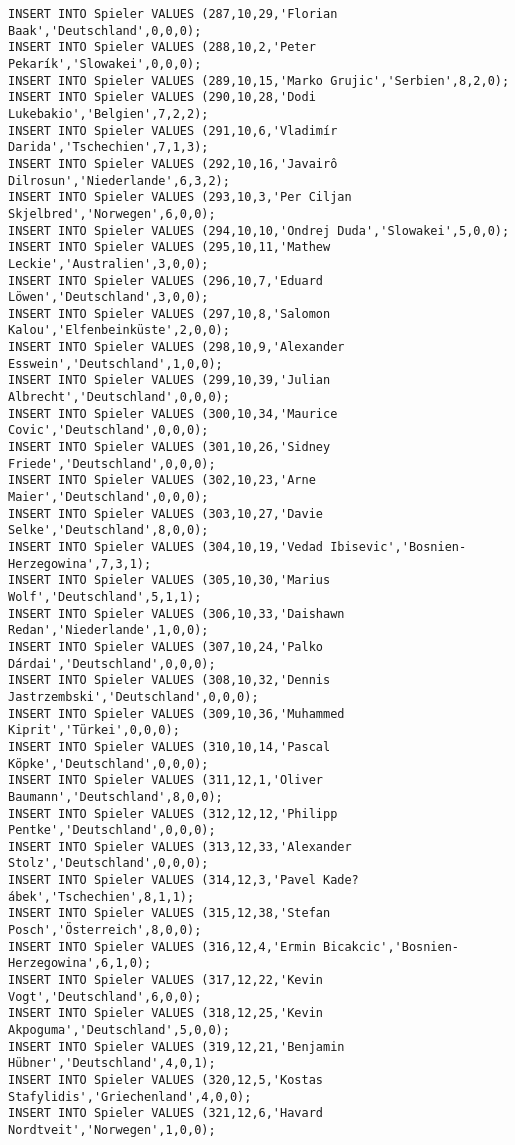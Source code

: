 \documentclass{lehramt-informatik-aufgabe}
\begin{document}
\begin{verbatim}
INSERT INTO Spieler VALUES (287,10,29,'Florian Baak','Deutschland',0,0,0);
INSERT INTO Spieler VALUES (288,10,2,'Peter Pekarík','Slowakei',0,0,0);
INSERT INTO Spieler VALUES (289,10,15,'Marko Grujic','Serbien',8,2,0);
INSERT INTO Spieler VALUES (290,10,28,'Dodi Lukebakio','Belgien',7,2,2);
INSERT INTO Spieler VALUES (291,10,6,'Vladimír Darida','Tschechien',7,1,3);
INSERT INTO Spieler VALUES (292,10,16,'Javairô Dilrosun','Niederlande',6,3,2);
INSERT INTO Spieler VALUES (293,10,3,'Per Ciljan Skjelbred','Norwegen',6,0,0);
INSERT INTO Spieler VALUES (294,10,10,'Ondrej Duda','Slowakei',5,0,0);
INSERT INTO Spieler VALUES (295,10,11,'Mathew Leckie','Australien',3,0,0);
INSERT INTO Spieler VALUES (296,10,7,'Eduard Löwen','Deutschland',3,0,0);
INSERT INTO Spieler VALUES (297,10,8,'Salomon Kalou','Elfenbeinküste',2,0,0);
INSERT INTO Spieler VALUES (298,10,9,'Alexander Esswein','Deutschland',1,0,0);
INSERT INTO Spieler VALUES (299,10,39,'Julian Albrecht','Deutschland',0,0,0);
INSERT INTO Spieler VALUES (300,10,34,'Maurice Covic','Deutschland',0,0,0);
INSERT INTO Spieler VALUES (301,10,26,'Sidney Friede','Deutschland',0,0,0);
INSERT INTO Spieler VALUES (302,10,23,'Arne Maier','Deutschland',0,0,0);
INSERT INTO Spieler VALUES (303,10,27,'Davie Selke','Deutschland',8,0,0);
INSERT INTO Spieler VALUES (304,10,19,'Vedad Ibisevic','Bosnien-Herzegowina',7,3,1);
INSERT INTO Spieler VALUES (305,10,30,'Marius Wolf','Deutschland',5,1,1);
INSERT INTO Spieler VALUES (306,10,33,'Daishawn Redan','Niederlande',1,0,0);
INSERT INTO Spieler VALUES (307,10,24,'Palko Dárdai','Deutschland',0,0,0);
INSERT INTO Spieler VALUES (308,10,32,'Dennis Jastrzembski','Deutschland',0,0,0);
INSERT INTO Spieler VALUES (309,10,36,'Muhammed Kiprit','Türkei',0,0,0);
INSERT INTO Spieler VALUES (310,10,14,'Pascal Köpke','Deutschland',0,0,0);
INSERT INTO Spieler VALUES (311,12,1,'Oliver Baumann','Deutschland',8,0,0);
INSERT INTO Spieler VALUES (312,12,12,'Philipp Pentke','Deutschland',0,0,0);
INSERT INTO Spieler VALUES (313,12,33,'Alexander Stolz','Deutschland',0,0,0);
INSERT INTO Spieler VALUES (314,12,3,'Pavel Kade?ábek','Tschechien',8,1,1);
INSERT INTO Spieler VALUES (315,12,38,'Stefan Posch','Österreich',8,0,0);
INSERT INTO Spieler VALUES (316,12,4,'Ermin Bicakcic','Bosnien-Herzegowina',6,1,0);
INSERT INTO Spieler VALUES (317,12,22,'Kevin Vogt','Deutschland',6,0,0);
INSERT INTO Spieler VALUES (318,12,25,'Kevin Akpoguma','Deutschland',5,0,0);
INSERT INTO Spieler VALUES (319,12,21,'Benjamin Hübner','Deutschland',4,0,1);
INSERT INTO Spieler VALUES (320,12,5,'Kostas Stafylidis','Griechenland',4,0,0);
INSERT INTO Spieler VALUES (321,12,6,'Havard Nordtveit','Norwegen',1,0,0);

\end{verbatim}
\end{document}
